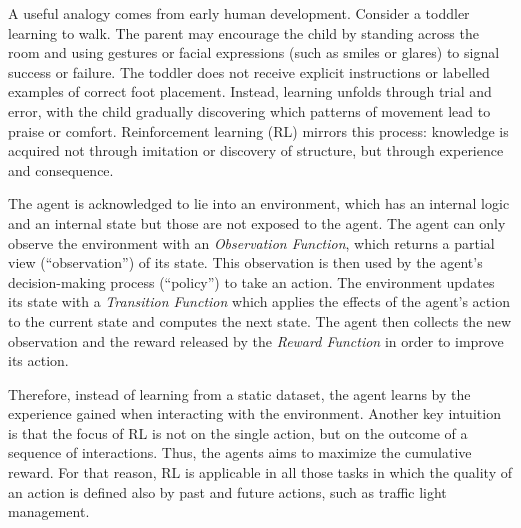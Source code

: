 A useful analogy comes from early human development. Consider a toddler learning to walk. The parent may encourage the child by standing across the room and using gestures or facial expressions (such as smiles or glares) to signal success or failure. The toddler does not receive explicit instructions or labelled examples of correct foot placement. Instead, learning unfolds through trial and error, with the child gradually discovering which patterns of movement lead to praise or comfort. Reinforcement learning (RL) mirrors this process: knowledge is acquired not through imitation or discovery of structure, but through experience and consequence.

The agent is acknowledged to lie into an environment, which has an internal logic and an internal state but those are not exposed to the agent.
The agent can only observe the environment with an \textit{Observation Function}, which returns a partial view (``observation'') of its state.
This observation is then used by the agent's decision-making process (``policy'') to take an action.
The environment updates its state with a \textit{Transition Function} which applies the effects of the agent's action to the current state and computes the next state.
The agent then collects the new observation and the reward released by the \textit{Reward Function} in order to improve its action.

Therefore, instead of learning from a static dataset, the agent learns by the experience gained when interacting with the environment.
Another key intuition is that the focus of RL is not on the single action, but on the outcome of a sequence of interactions. Thus, the agents aims to maximize the cumulative reward.
For that reason, RL is applicable in all those tasks in which the quality of an action is defined also by past and future actions, such as traffic light management.

